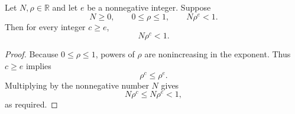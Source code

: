 \begin{helper}
Let \(N,\rho\in\mathbb R\) and let \(e\) be a nonnegative integer.  Suppose
\[
  N\ge0,\qquad 0\le\rho\le1,\qquad N\rho^e<1.
\]
Then for every integer \(c\ge e\),
\[
  N\rho^c<1.
\]
\end{helper}
\begin{proof}
Because \(0\le\rho\le1\), powers of \(\rho\) are nonincreasing in the
exponent.  Thus \(c\ge e\) implies
\[
  \rho^c\le\rho^e.
\]
Multiplying by the nonnegative number \(N\) gives
\[
  N\rho^c\le N\rho^e<1,
\]
as required.
\end{proof}
